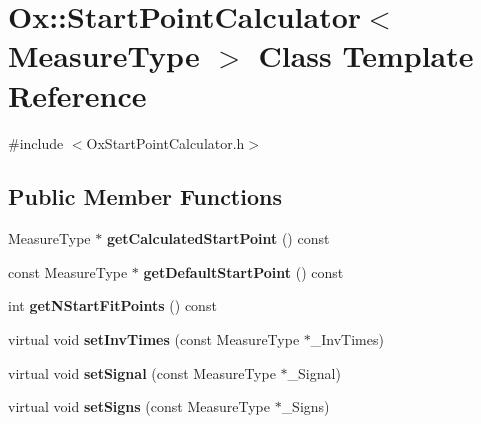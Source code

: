 \hypertarget{class_ox_1_1_start_point_calculator}{\section{Ox\-:\-:Start\-Point\-Calculator$<$ Measure\-Type $>$ Class Template Reference}
\label{class_ox_1_1_start_point_calculator}
}


{\ttfamily \#include $<$Ox\-Start\-Point\-Calculator.\-h$>$}

\subsection*{Public Member Functions}
\begin{DoxyCompactItemize}
\item 
\hypertarget{class_ox_1_1_start_point_calculator_a48b39c1d6bb733821f7297593e424728}{Measure\-Type $\ast$ {\bfseries get\-Calculated\-Start\-Point} () const }\label{class_ox_1_1_start_point_calculator_a48b39c1d6bb733821f7297593e424728}

\item 
\hypertarget{class_ox_1_1_start_point_calculator_a173bb7ba6c41fea0d1b5ac667a925445}{const Measure\-Type $\ast$ {\bfseries get\-Default\-Start\-Point} () const }\label{class_ox_1_1_start_point_calculator_a173bb7ba6c41fea0d1b5ac667a925445}

\item 
\hypertarget{class_ox_1_1_start_point_calculator_a76811718d5bd15ca3e5be51c33cfa8b9}{int {\bfseries get\-N\-Start\-Fit\-Points} () const }\label{class_ox_1_1_start_point_calculator_a76811718d5bd15ca3e5be51c33cfa8b9}

\item 
\hypertarget{class_ox_1_1_start_point_calculator_a0632bd0dcf7707930058d63e2176fc7a}{virtual void {\bfseries set\-Inv\-Times} (const Measure\-Type $\ast$\-\_\-\-Inv\-Times)}\label{class_ox_1_1_start_point_calculator_a0632bd0dcf7707930058d63e2176fc7a}

\item 
\hypertarget{class_ox_1_1_start_point_calculator_a21beb5845568afe488bb5d4e6d4176bb}{virtual void {\bfseries set\-Signal} (const Measure\-Type $\ast$\-\_\-\-Signal)}\label{class_ox_1_1_start_point_calculator_a21beb5845568afe488bb5d4e6d4176bb}

\item 
\hypertarget{class_ox_1_1_start_point_calculator_a1245375d6cad369f18ab4a32ddb28446}{virtual void {\bfseries set\-Signs} (const Measure\-Type $\ast$\-\_\-\-Signs)}\label{class_ox_1_1_start_point_calculator_a1245375d6cad369f18ab4a32ddb28446}


\end{DoxyCompactItemize}

